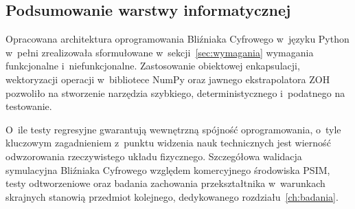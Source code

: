 \subsection{Podsumowanie warstwy informatycznej}
\label{subsec:realizacja-podsumowanie}

Opracowana architektura oprogramowania Bliźniaka Cyfrowego w~języku Python w~pełni zrealizowała sformułowane w~sekcji~\ref{sec:wymagania} wymagania funkcjonalne i~niefunkcjonalne. Zastosowanie obiektowej enkapsulacji, wektoryzacji operacji w~bibliotece NumPy oraz jawnego ekstrapolatora ZOH pozwoliło na stworzenie narzędzia szybkiego, deterministycznego i~podatnego na testowanie.

O~ile testy regresyjne gwarantują wewnętrzną spójność oprogramowania, o~tyle kluczowym zagadnieniem z~punktu widzenia nauk technicznych jest wierność odwzorowania rzeczywistego układu fizycznego. Szczegółowa walidacja symulacyjna Bliźniaka Cyfrowego względem komercyjnego środowiska PSIM, testy odtworzeniowe oraz badania zachowania przekształtnika w~warunkach skrajnych stanowią przedmiot kolejnego, dedykowanego rozdziału~\ref{ch:badania}.
